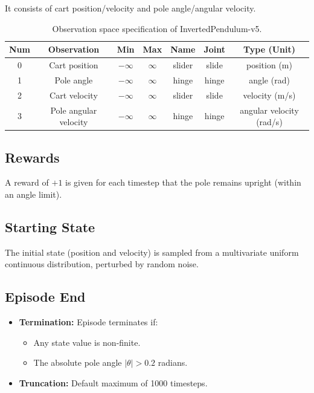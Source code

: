 \documentclass[12pt]{article}
\begin{document}
It consists of cart position/velocity and pole angle/angular velocity.  

\begin{table}[h!]
\centering
\begin{tabular}{|c|c|c|c|c|c|c|}
\hline
Num & Observation & Min & Max & Name & Joint & Type (Unit) \\
\hline
0 & Cart position & $-\infty$ & $\infty$ & slider & slide & position (m) \\
1 & Pole angle    & $-\infty$ & $\infty$ & hinge  & hinge & angle (rad) \\
2 & Cart velocity & $-\infty$ & $\infty$ & slider & slide & velocity (m/s) \\
3 & Pole angular velocity & $-\infty$ & $\infty$ & hinge & hinge & angular velocity (rad/s) \\
\hline
\end{tabular}
\caption{Observation space specification of InvertedPendulum-v5.}
\end{table}

\subsection{Rewards}
A reward of $+1$ is given for each timestep that the pole remains upright (within an angle limit).  

\subsection{Starting State}
The initial state (position and velocity) is sampled from a multivariate uniform continuous distribution, perturbed by random noise.

\subsection{Episode End}
\begin{itemize}
    \item \textbf{Termination:} Episode terminates if:
    \begin{itemize}
        \item Any state value is non-finite.
        \item The absolute pole angle $|\theta| > 0.2$ radians.
    \end{itemize}
    \item \textbf{Truncation:} Default maximum of 1000 timesteps.
\end{itemize}
\end{document}
